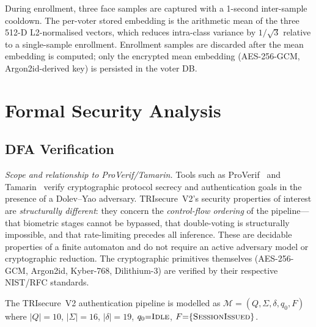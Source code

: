 \documentclass[pdflatex,sn-vancouver-num]{sn-jnl}%
\theoremstyle{thmstyleone}%
\theoremstyle{thmstyletwo}%
\theoremstyle{thmstylethree}%
\begin{document}
During enrollment, three face samples are captured with a 1-second
inter-sample cooldown. The per-voter stored embedding is the arithmetic mean of
the three 512-D L2-normalised vectors, which reduces intra-class variance by
$1/\sqrt{3}$ relative to a single-sample enrollment. Enrollment samples are
discarded after the mean embedding is computed; only the encrypted mean
embedding (AES-256-GCM, Argon2id-derived key) is persisted in the voter DB.

\section{Formal Security Analysis}\label{sec:security}

\subsection{DFA Verification}\label{sec:dfa}

\textit{Scope and relationship to ProVerif/Tamarin.} Tools such as
ProVerif~\cite{blanchet2016proverif} and Tamarin~\cite{meier2013tamarin}
verify cryptographic protocol secrecy and authentication goals in the presence
of a Dolev--Yao adversary. TRIsecure~V2's security properties of interest are
\emph{structurally different}: they concern the \emph{control-flow ordering}
of the pipeline---that biometric stages cannot be bypassed, that double-voting
is structurally impossible, and that rate-limiting precedes all inference.
These are decidable properties of a finite automaton and do not require an
active adversary model or cryptographic reduction. The cryptographic primitives
themselves (AES-256-GCM, Argon2id, Kyber-768, Dilithium-3) are verified by
their respective NIST/RFC standards.

The TRIsecure~V2 authentication pipeline is modelled as \(\mathcal{M} =
(Q, \Sigma, \delta, q_0, F)\) where \(|Q|{=}10\), \(|\Sigma|{=}16\),
\(|\delta|{=}19\), \(q_0{=}\textsc{Idle}\),
\(F{=}\{\textsc{SessionIssued}\}\).
\end{document}
